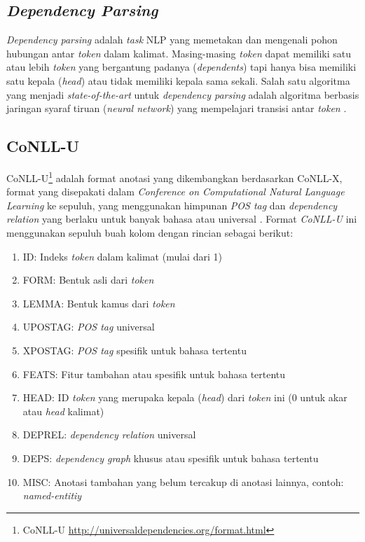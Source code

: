 \subsection{\textit{Dependency Parsing}}

\textit{Dependency parsing} adalah \textit{task} NLP yang memetakan dan mengenali pohon hubungan antar \textit{token} dalam kalimat. Masing-masing \textit{token} dapat memiliki satu atau lebih \textit{token} yang bergantung padanya (\textit{dependents}) tapi hanya bisa memiliki satu kepala (\textit{head}) atau tidak memiliki kepala sama sekali. Salah satu algoritma yang menjadi \textit{state-of-the-art} untuk \textit{dependency parsing} adalah algoritma berbasis jaringan syaraf tiruan (\textit{neural network}) yang mempelajari transisi antar \textit{token} \citep{chen2014fast}. 

\subsection{CoNLL-U}

CoNLL-U\footnote{CoNLL-U \url{http://universaldependencies.org/format.html}} adalah format anotasi yang dikembangkan berdasarkan CoNLL-X, format yang disepakati dalam \textit{Conference on Computational Natural Language Learning} ke sepuluh, yang menggunakan himpunan \textit{POS tag} dan \textit{dependency relation} yang berlaku untuk banyak bahasa atau universal \citep{nivre2016universal}. Format \textit{CoNLL-U} ini menggunakan sepuluh buah kolom dengan rincian sebagai berikut:

\begin{enumerate}
	\item ID: Indeks \textit{token} dalam kalimat (mulai dari 1)
	\item FORM: Bentuk asli dari \textit{token}
	\item LEMMA: Bentuk kamus dari \textit{token}
	\item UPOSTAG: \textit{POS tag} universal
	\item XPOSTAG: \textit{POS tag} spesifik untuk bahasa tertentu
	\item FEATS: Fitur tambahan atau spesifik untuk bahasa tertentu
	\item HEAD: ID \textit{token} yang merupaka kepala (\textit{head}) dari \textit{token} ini (0 untuk akar atau \textit{head} kalimat)
	\item DEPREL: \textit{dependency relation} universal
	\item DEPS: \textit{dependency graph} khusus atau spesifik untuk bahasa tertentu
	\item MISC: Anotasi tambahan yang belum tercakup di anotasi lainnya, contoh: \textit{named-entitiy}
\end{enumerate}

